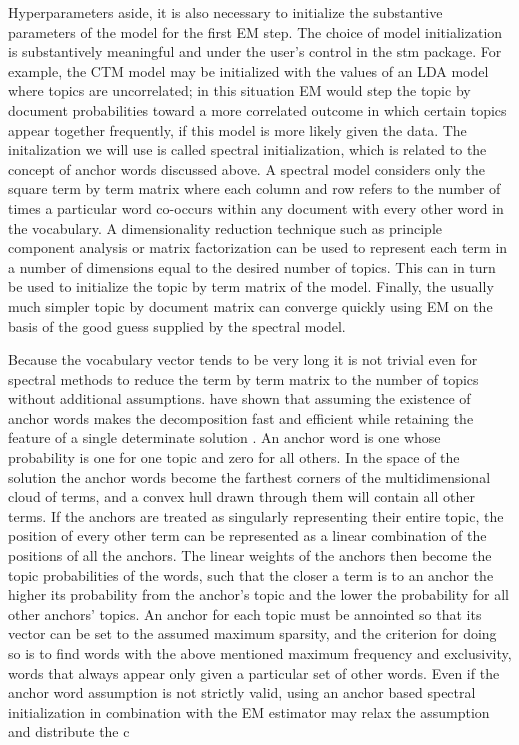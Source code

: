 \documentclass[]{book}
\theoremstyle{definition}
\theoremstyle{definition}
\theoremstyle{definition}
\theoremstyle{remark}
\begin{document}
Hyperparameters aside, it is also necessary to initialize the
substantive parameters of the model for the first EM step. The choice of
model initialization is substantively meaningful and under the user's
control in the stm package. For example, the CTM model may be
initialized with the values of an LDA model where topics are
uncorrelated; in this situation EM would step the topic by document
probabilities toward a more correlated outcome in which certain topics
appear together frequently, if this model is more likely given the data.
The initalization we will use is called spectral initialization, which
is related to the concept of anchor words discussed above. A spectral
model considers only the square term by term matrix where each column
and row refers to the number of times a particular word co-occurs within
any document with every other word in the vocabulary. A dimensionality
reduction technique such as principle component analysis or matrix
factorization can be used to represent each term in a number of
dimensions equal to the desired number of topics. This can in turn be
used to initialize the topic by term matrix of the model. Finally, the
usually much simpler topic by document matrix can converge quickly using
EM on the basis of the good guess supplied by the spectral model.

Because the vocabulary vector tends to be very long it is not trivial
even for spectral methods to reduce the term by term matrix to the
number of topics without additional assumptions.
\citet{Arora2018Learning} have shown that assuming the existence of
anchor words makes the decomposition fast and efficient while retaining
the feature of a single determinate solution
\citep{Roberts2016Navigating}. An anchor word is one whose probability
is one for one topic and zero for all others. In the space of the
solution the anchor words become the farthest corners of the
multidimensional cloud of terms, and a convex hull drawn through them
will contain all other terms. If the anchors are treated as singularly
representing their entire topic, the position of every other term can be
represented as a linear combination of the positions of all the anchors.
The linear weights of the anchors then become the topic probabilities of
the words, such that the closer a term is to an anchor the higher its
probability from the anchor's topic and the lower the probability for
all other anchors' topics. An anchor for each topic must be annointed so
that its vector can be set to the assumed maximum sparsity, and the
criterion for doing so is to find words with the above mentioned maximum
frequency and exclusivity, words that always appear only given a
particular set of other words. Even if the anchor word assumption is not
strictly valid, using an anchor based spectral initialization in
combination with the EM estimator may relax the assumption and
distribute the c
\end{document}
